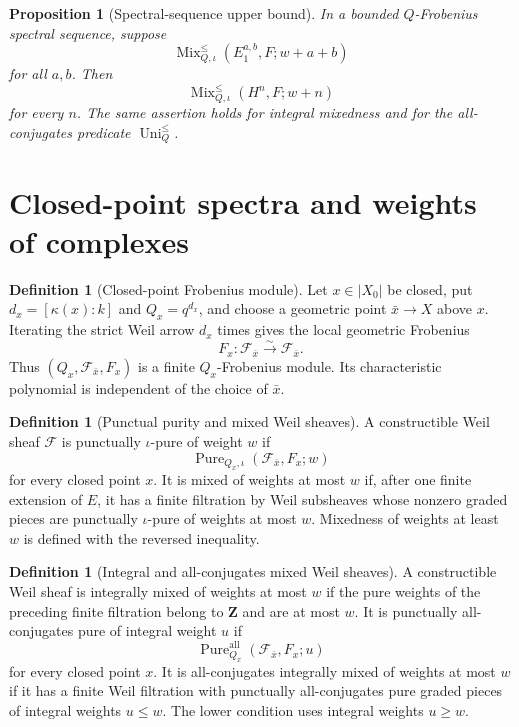 \documentclass[10pt]{article}
\newtheorem{proposition}[theorem]{Proposition}
\theoremstyle{definition}
\newtheorem{definition}[theorem]{Definition}
\newcommand{\MixLe}{\operatorname{Mix}^{\leq}}
\newcommand{\UniLe}{\operatorname{Uni}^{\leq}}
\newcommand{\Pure}{\operatorname{Pure}}
\begin{document}
\begin{proposition}[Spectral-sequence upper bound]
In a bounded \(Q\)-Frobenius spectral sequence, suppose
\[
             \MixLe_{Q,\iota}(E_1^{a,b},F;w+a+b)
\]
for all \(a,b\).  Then
\[
             \MixLe_{Q,\iota}(H^n,F;w+n)
\]
for every \(n\).  The same assertion holds for integral mixedness and for
the all-conjugates predicate \(\UniLe_Q\).
\end{proposition}

\section{Closed-point spectra and weights of complexes}

\begin{definition}[Closed-point Frobenius module]
Let \(x\in|X_0|\) be closed, put
\(d_x=[\kappa(x):k]\) and \(Q_x=q^{d_x}\), and choose a geometric point
\(\bar x\to X\) above \(x\).  Iterating the strict Weil arrow \(d_x\) times
gives the local geometric Frobenius
\[
 F_x:\mathcal F_{\bar x}\xrightarrow{\sim}\mathcal F_{\bar x}.
\]
Thus \((Q_x,\mathcal F_{\bar x},F_x)\) is a finite
\(Q_x\)-Frobenius module.  Its characteristic polynomial is independent of
the choice of \(\bar x\).
\end{definition}

\begin{definition}[Punctual purity and mixed Weil sheaves]
A constructible Weil sheaf \(\mathcal F\) is punctually
\(\iota\)-pure of weight \(w\) if
\[
 \Pure_{Q_x,\iota}(\mathcal F_{\bar x},F_x;w)
\]
for every closed point \(x\).  It is mixed of weights at most \(w\) if,
after one finite extension of \(E\), it has a finite filtration by Weil
subsheaves whose nonzero graded pieces are punctually \(\iota\)-pure of
weights at most \(w\).  Mixedness of weights at least \(w\) is defined with
the reversed inequality.
\end{definition}

\begin{definition}[Integral and all-conjugates mixed Weil sheaves]
A constructible Weil sheaf is integrally mixed of weights at most \(w\) if
the pure weights of the preceding finite filtration belong to
\(\mathbf Z\) and are at most \(w\).  It is punctually all-conjugates pure
of integral weight \(u\) if
\[
 \Pure_{Q_x}^{\mathrm{all}}(\mathcal F_{\bar x},F_x;u)
\]
for every closed point \(x\).  It is all-conjugates integrally mixed of
weights at most \(w\) if it has a finite Weil filtration with punctually
all-conjugates pure graded pieces of integral weights \(u\leq w\).  The
lower condition uses integral weights \(u\geq w\).
\end{definition}
\end{document}
